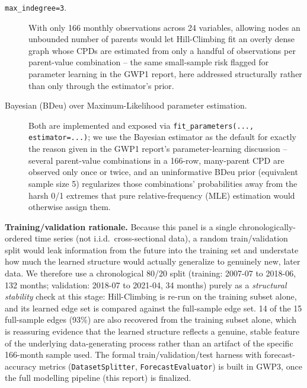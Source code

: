 \begin{description}
  \item[\texttt{max\_indegree=3}.] With only 166 monthly observations
    across 24 variables, allowing nodes an unbounded number of parents
    would let Hill-Climbing fit an overly dense graph whose CPDs are
    estimated from only a handful of observations per parent-value
    combination -- the same small-sample risk flagged for parameter
    learning in the GWP1 report, here addressed structurally rather than
    only through the estimator's prior.
  \item[Bayesian (BDeu) over Maximum-Likelihood parameter estimation.]
    Both are implemented and exposed via \texttt{fit\_parameters(...,
    estimator=...)}; we use the Bayesian estimator as the default for
    exactly the reason given in the GWP1 report's parameter-learning
    discussion -- several parent-value combinations in a 166-row,
    many-parent CPD are observed only once or twice, and an
    uninformative BDeu prior (equivalent sample size 5) regularizes
    those combinations' probabilities away from the harsh 0/1 extremes
    that pure relative-frequency (MLE) estimation would otherwise
    assign them.
\end{description}

\textbf{Training/validation rationale.} Because this panel is a single
chronologically-ordered time series (not i.i.d.\ cross-sectional data),
a random train/validation split would leak information from the future
into the training set and understate how much the learned structure
would actually generalize to genuinely new, later data. We therefore use
a chronological 80/20 split (training: 2007-07 to 2018-06, 132 months;
validation: 2018-07 to 2021-04, 34 months) purely as a \emph{structural
stability} check at this stage: Hill-Climbing is re-run on the training
subset alone, and its learned edge set is compared against the
full-sample edge set. 14 of the 15 full-sample edges (93\%) are also
recovered from the training subset alone, which is reassuring evidence
that the learned structure reflects a genuine, stable feature of the
underlying data-generating process rather than an artifact of the
specific 166-month sample used. The formal train/validation/test
harness with forecast-accuracy metrics (\texttt{DatasetSplitter},
\texttt{ForecastEvaluator}) is built in GWP3, once the full modelling
pipeline (this report) is finalized.

